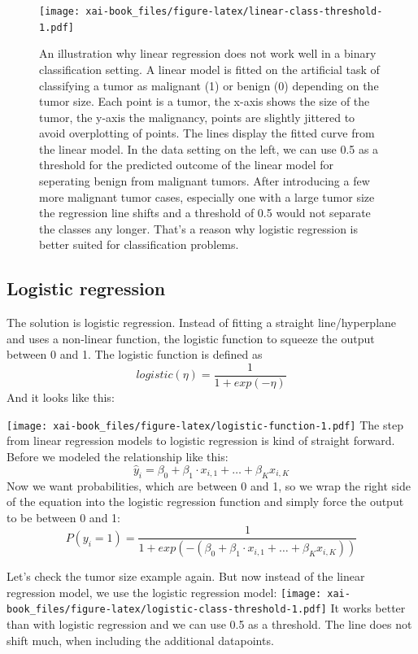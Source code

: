 \documentclass[12pt,]{krantz}
\theoremstyle{definition}
\theoremstyle{definition}
\theoremstyle{definition}
\theoremstyle{remark}
\begin{document}
\begin{figure}
\centering
\texttt{[image: xai-book\_files/figure-latex/linear-class-threshold-1.pdf]}
\caption{\label{fig:linear-class-threshold}An illustration why linear
regression does not work well in a binary classification setting. A
linear model is fitted on the artificial task of classifying a tumor as
malignant (1) or benign (0) depending on the tumor size. Each point is a
tumor, the x-axis shows the size of the tumor, the y-axis the
malignancy, points are slightly jittered to avoid overplotting of
points. The lines display the fitted curve from the linear model. In the
data setting on the left, we can use 0.5 as a threshold for the
predicted outcome of the linear model for seperating benign from
malignant tumors. After introducing a few more malignant tumor cases,
especially one with a large tumor size the regression line shifts and a
threshold of 0.5 would not separate the classes any longer. That's a
reason why logistic regression is better suited for classification
problems.}
\end{figure}

\subsection{Logistic regression}\label{logistic-regression}

The solution is logistic regression. Instead of fitting a straight
line/hyperplane and uses a non-linear function, the logistic function to
squeeze the output between 0 and 1. The logistic function is defined as
\[ logistic(\eta) = \frac{1}{1 + exp(-\eta)}\] And it looks like this:

\texttt{[image: xai-book\_files/figure-latex/logistic-function-1.pdf]}
The step from linear regression models to logistic regression is kind of
straight forward. Before we modeled the relationship like this:
\[\hat{y}_{i} = \beta_{0} + \beta_{1} \cdot x_{i,1} + \ldots + \beta_{K} x_{i,K} \]
Now we want probabilities, which are between 0 and 1, so we wrap the
right side of the equation into the logistic regression function and
simply force the output to be between 0 and 1:
\[P(y_{i}=1) =  \frac{1}{1 + exp(-(\beta_{0} + \beta_{1} \cdot x_{i,1} + \ldots + \beta_{K} x_{i,K}))}\]

Let's check the tumor size example again. But now instead of the linear
regression model, we use the logistic regression model:
\texttt{[image: xai-book\_files/figure-latex/logistic-class-threshold-1.pdf]}
It works better than with logistic regression and we can use 0.5 as a
threshold. The line does not shift much, when including the additional
datapoints.
\end{document}
